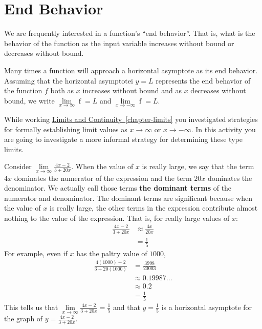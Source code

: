 \documentclass[12pt,]{book}
\newcommand{\terminology}[1]{\textbf{#1}}
\theoremstyle{plain}
\theoremstyle{definition}
\numberwithin{equation}{section}
\newcommand{\fe}[2]{\mathop{{#1}{\left(#2\right)}}}
\begin{document}
\section[End Behavior]{End Behavior}\label{section-end-behavior}
We are frequently interested in a function's ``end behavior''.  That is, what is the behavior of the function as the input variable increases without bound or decreases without bound.%
\par
Many times a function will approach a horizontal asymptote as its end behavior.  Assuming that the horizontal asymptotei \(y=L\) represents the end behavior of the function \(f\) both as \(x\) increases without bound and as \(x\) decreases without bound, we write \(\lim\limits_{x\to\infty}\fe{f}{x}=L\) and \(\lim\limits_{x\to-\infty}\fe{f}{x}=L\).%
\par
While working \hyperref[chapter-limits]{Limits and Continuity~\ref*{chapter-limits}} you investigated strategies for formally establishing limit values as \(x\to\infty\) or \(x\to-\infty\).  In this activity you are going to investigate a more informal strategy for determining these type limits.%
\par
Consider \(\lim\limits_{x\to\infty}\frac{4x-2}{3+20x}\). When the value of \(x\) is really large, we say that the term \(4x\) dominates the numerator of the expression and the term \(20x\) dominates the denominator. We actually call those terms \terminology{the dominant terms} of the numerator and denominator.  The dominant terms are significant because when the value of \(x\) is really large, the other terms in the expression contribute almost nothing to the value of the expression.   That is, for really large values of \(x\):\begin{align*}
\frac{4x-2}{3+20x}&\approx\frac{4x}{20x}\\
&=\frac{1}{5}
\end{align*}For example, even if \(x\) has the paltry value of \(1000\), \begin{align*}
\frac{4(1000)-2}{3+20(1000)}&=\frac{3998}{20003}\\
&\approx0.19987\ldots\\
&\approx0.2\\
&=\frac{1}{5}
\end{align*}This tells us that \(\lim\limits_{x\to\infty}\frac{4x-2}{3+20x}=\frac{1}{5}\) and that \(y=\frac{1}{5}\) is a horizontal asymptote for the graph of \(y=\frac{4x-2}{3+20x}\).%
\typeout{************************************************}
\typeout{************************************************}
\end{document}
